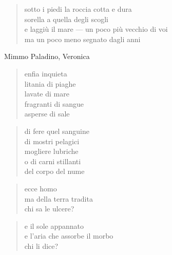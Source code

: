 	\begin{verse}
		sotto i piedi la roccia cotta e dura\\
		sorella a quella degli scogli\\
		e laggiù il mare — un poco più vecchio di voi\\
		ma un poco meno segnato dagli anni
	\end{verse}

\clearpage


\begin{artItem}
	Mimmo Paladino, Veronica
\end{artItem}

	\begin{verse}
		enfia inquieta\\
		litania di piaghe\\
		lavate di mare\\
		fragranti di sangue\\
		asperse di sale
	\end{verse}

	\begin{verse}
		di fere quel sanguine\\
		di mostri pelagici\\
		mogliere lubriche\\
		o di carni stillanti\\
		del corpo del nume
	\end{verse}

	\begin{verse}
		ecce homo\\
		ma della terra tradita\\
		chi sa le ulcere?
	\end{verse}

	\begin{verse}
		e il sole appannato\\
		e l’aria che assorbe il morbo\\
		chi li dice?
	\end{verse}
